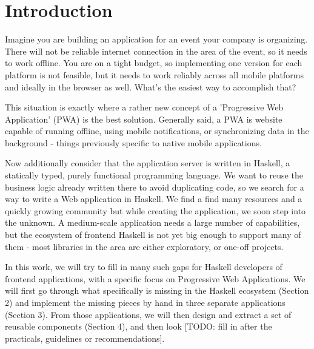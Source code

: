 \documentclass[english,odsaz]{fitthesis}
\date{\today}
\title{}
\begin{document}
\maketitle
\setlength{\parskip}{0pt}
{\hypersetup{hidelinks}\tableofcontents}
\iftotalfigures\listoffigures\fi
\iftotaltables\listoftables\fi
\iftotallistings\listoflistings\fi
\iftwoside\cleardoublepage\fi
\setlength{\parskip}{0.5\bigskipamount}

\chapter{Introduction}
\label{sec:org01f5662}
Imagine you are building an application for an event your company is
organizing. There will not be reliable internet connection in the area of the
event, so it needs to work offline. You are on a tight budget, so implementing
one version for each platform is not feasible, but it needs to work reliably
across all mobile platforms and ideally in the browser as well. What's the
easiest way to accomplish that?

This situation is exactly where a rather new concept of a 'Progressive Web
Application' (PWA) is the best solution. Generally said, a PWA is website
capable of running offline, using mobile notifications, or synchronizing data in
the background - things previously specific to native mobile applications.

Now additionally consider that the application server is written in Haskell, a
statically typed, purely functional programming language. We want to reuse the
business logic already written there to avoid duplicating code, so we search for
a way to write a Web application in Haskell. We find a find many resources and a
quickly growing community but while creating the application, we soon step into
the unknown. A medium-scale application needs a large number of capabilities,
but the ecosystem of frontend Haskell is not yet big enough to support many of
them - most libraries in the area are either exploratory, or one-off projects.

In this work, we will try to fill in many such gaps for Haskell developers of
frontend applications, with a specific focus on Progressive Web Applications. We
will first go through what specifically is missing in the Haskell ecosystem
(Section 2) and implement the missing pieces by hand in three separate
applications (Section 3). From those applications, we will then design and
extract a set of reusable components (Section 4), and then look [TODO: fill in
after the practicals, guidelines or recommendations].
\end{document}
